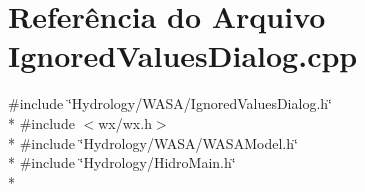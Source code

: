 \section{Referência do Arquivo Ignored\+Values\+Dialog.\+cpp}
\label{_ignored_values_dialog_8cpp}
{\ttfamily \#include \char`\"{}Hydrology/\+W\+A\+S\+A/\+Ignored\+Values\+Dialog.\+h\char`\"{}}\\*
{\ttfamily \#include $<$wx/wx.\+h$>$}\\*
{\ttfamily \#include \char`\"{}Hydrology/\+W\+A\+S\+A/\+W\+A\+S\+A\+Model.\+h\char`\"{}}\\*
{\ttfamily \#include \char`\"{}Hydrology/\+Hidro\+Main.\+h\char`\"{}}\\*

